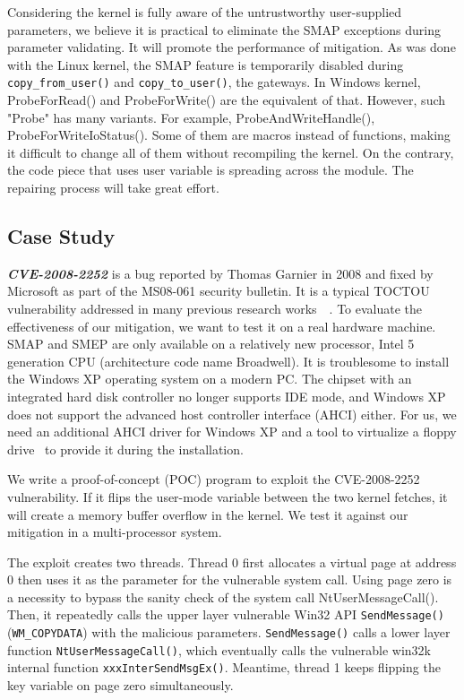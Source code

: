 Considering the kernel is fully aware of the untrustworthy user-supplied parameters, we believe it is practical to eliminate the SMAP exceptions during parameter validating. It will promote the performance of mitigation. As was done with the Linux kernel, the SMAP feature is temporarily disabled during \texttt{copy\_from\_user()} and \texttt{copy\_to\_user()}, the gateways. In Windows kernel, ProbeForRead() and ProbeForWrite() are the equivalent of that. However, such "Probe" has many variants. For example, ProbeAndWriteHandle(), ProbeForWriteIoStatus(). Some of them are macros instead of functions, making it difficult to change all of them without recompiling the kernel. On the contrary, the code piece that uses user variable is spreading across the module. The repairing process will take great effort. 

\subsection{Case Study}


\textbf{\textit{CVE-2008-2252}} is a bug reported by Thomas Garnier in 2008 and fixed by Microsoft as part of the MS08-061 security bulletin.  It is a typical TOCTOU vulnerability addressed in many previous research works~\cite{wang2019dftracker}~\cite{jurczyk2013identifying}. To evaluate the effectiveness of our mitigation, we want to test it on a real hardware machine. SMAP and SMEP are only available on a relatively new processor, Intel 5 generation CPU (architecture code name Broadwell). It is troublesome to install the Windows XP operating system on a modern PC. The chipset with an integrated hard disk controller no longer supports IDE mode, and Windows XP does not support the advanced host controller interface (AHCI) either. For us, we need an additional AHCI driver for Windows XP and a tool to virtualize a floppy drive~\cite{installxpskylake} to provide it during the installation.

We write a proof-of-concept (POC) program to exploit the CVE-2008-2252 vulnerability. If it flips the user-mode variable between the two kernel fetches, it will create a memory buffer overflow in the kernel. We test it against our mitigation in a multi-processor system.



The exploit creates two threads. Thread 0 first allocates a virtual page at address 0 then uses it as the parameter for the vulnerable system call. Using page zero is a necessity to bypass the sanity check of the system call NtUserMessageCall(). Then, it repeatedly calls the upper layer vulnerable Win32 API \texttt{SendMessage()} (\texttt{WM\_COPYDATA}) with the malicious parameters. \texttt{SendMessage()} calls a lower layer function \texttt{NtUserMessageCall()}, which eventually calls the vulnerable win32k internal function \texttt{xxxInterSendMsgEx()}. Meantime, thread 1 keeps flipping the key variable on page zero simultaneously.


